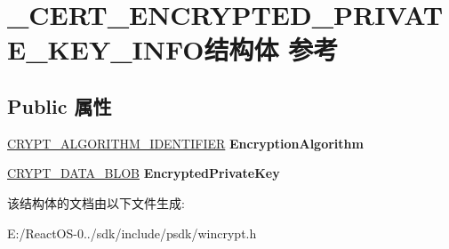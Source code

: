 \hypertarget{struct___c_e_r_t___e_n_c_r_y_p_t_e_d___p_r_i_v_a_t_e___k_e_y___i_n_f_o}{}\section{\+\_\+\+C\+E\+R\+T\+\_\+\+E\+N\+C\+R\+Y\+P\+T\+E\+D\+\_\+\+P\+R\+I\+V\+A\+T\+E\+\_\+\+K\+E\+Y\+\_\+\+I\+N\+F\+O结构体 参考}
\label{struct___c_e_r_t___e_n_c_r_y_p_t_e_d___p_r_i_v_a_t_e___k_e_y___i_n_f_o}
\subsection*{Public 属性}
\begin{DoxyCompactItemize}
\item 
\mbox{\label{struct___c_e_r_t___e_n_c_r_y_p_t_e_d___p_r_i_v_a_t_e___k_e_y___i_n_f_o_acae03715bae762e2bb7a74b07e3216de}} 
\hyperlink{struct___c_r_y_p_t___a_l_g_o_r_i_t_h_m___i_d_e_n_t_i_f_i_e_r}{C\+R\+Y\+P\+T\+\_\+\+A\+L\+G\+O\+R\+I\+T\+H\+M\+\_\+\+I\+D\+E\+N\+T\+I\+F\+I\+ER} {\bfseries Encryption\+Algorithm}
\item 
\mbox{\label{struct___c_e_r_t___e_n_c_r_y_p_t_e_d___p_r_i_v_a_t_e___k_e_y___i_n_f_o_a25344011b47ebb79e56706e82d81db4d}} 
\hyperlink{struct___c_r_y_p_t_o_a_p_i___b_l_o_b}{C\+R\+Y\+P\+T\+\_\+\+D\+A\+T\+A\+\_\+\+B\+L\+OB} {\bfseries Encrypted\+Private\+Key}
\end{DoxyCompactItemize}


该结构体的文档由以下文件生成\+:\begin{DoxyCompactItemize}
\item 
E\+:/\+React\+O\+S-\/0../sdk/include/psdk/wincrypt.\+h\end{DoxyCompactItemize}
